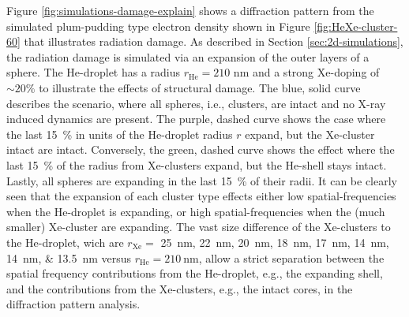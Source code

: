 Figure \ref{fig:simulations-damage-explain} shows a diffraction pattern from the simulated plum-pudding type electron density shown in Figure \ref{fig:HeXe-cluster-60} that illustrates radiation damage. As described in Section \ref{sec:2d-simulations}, the radiation damage is simulated via an expansion of the outer layers of a sphere. The He-droplet has a radius $r_{\text{He}}=210$ nm and a strong Xe-doping of $\sim 20 \%$ to illustrate the effects of structural damage. The blue, solid curve describes the scenario, where all spheres, i.e., clusters, are intact and no X-ray induced dynamics are present. The purple, dashed curve shows the case where the last \SI{15}{\percent} in units of the He-droplet radius $r$ expand, but the Xe-cluster intact are intact. Conversely, the green, dashed curve shows the effect where the last \SI{15}{\percent} of the radius from Xe-clusters expand, but the He-shell stays intact. Lastly, all spheres are expanding in the last \SI{15}{\percent} of their radii. It can be clearly seen that the expansion of each cluster type effects either low spatial-frequencies when the He-droplet is expanding, or high spatial-frequencies when the (much smaller) Xe-cluster are expanding. The vast size difference of the Xe-clusters to the He-droplet, wich are $r_{\text{Xe}}=$ \SIlist{25;22;20;18;17;14;14;13.5}{\nano\meter} versus $r_{\text{He}}=\SI{210}{\nano\meter}$, allow a strict separation between the spatial frequency contributions from the He-droplet, e.g., the expanding shell, and the contributions from the Xe-clusters, e.g., the intact cores, in the diffraction pattern analysis.\\[1\baselineskip]
